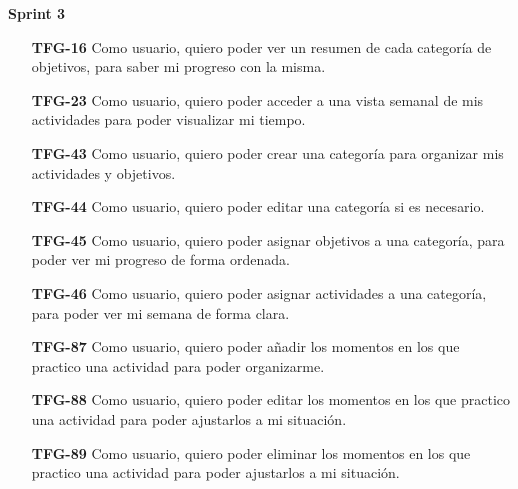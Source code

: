 \documentclass[10pt, a4paper]{aqademic}
\begin{document}
\textbf{Sprint 3}
\begin{itemize}[leftmargin=16mm]
	\item [\textbf{TFG-16}] Como usuario, quiero poder ver un resumen de cada categoría de objetivos, para saber mi progreso con la misma.
	
	\item [\textbf{TFG-23}] Como usuario, quiero poder acceder a una vista semanal de mis actividades para poder visualizar mi tiempo.
	
	\item [\textbf{TFG-43}] Como usuario, quiero poder crear una categoría para organizar mis actividades y objetivos.
	
	\item [\textbf{TFG-44}] Como usuario, quiero poder editar una categoría si es necesario.
	
	\item [\textbf{TFG-45}] Como usuario, quiero poder asignar objetivos a una categoría, para poder ver mi progreso de forma ordenada.
	
	\item [\textbf{TFG-46}] Como usuario, quiero poder asignar actividades a una categoría, para poder ver mi semana de forma clara.
	
	\item [\textbf{TFG-87}] Como usuario, quiero poder añadir los momentos en los que practico una actividad para poder organizarme.
	
	
	\item [\textbf{TFG-88}] Como usuario, quiero poder editar los momentos en los que practico una actividad para poder ajustarlos a mi situación.
	
	\item [\textbf{TFG-89}] Como usuario, quiero poder eliminar los momentos en los que practico una actividad para poder ajustarlos a mi situación.
\end{itemize}
\end{document}
